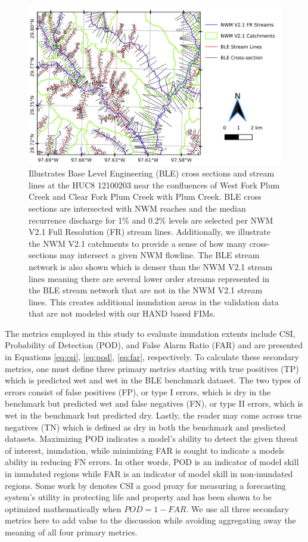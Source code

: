 \documentclass[draft]{dependencies/agujournal2019}
\begin{document}
%
\begin{figure}[H]
\centering
\includegraphics[scale=1.0]{figures/ble_evaluation_method.jpg}
\caption{
Illustrates Base Level Engineering (BLE) cross sections and stream lines at the HUC8 12100203 near the confluences of West Fork Plum Creek and Clear Fork Plum Creek with Plum Creek.
BLE cross sections are intersected with NWM reaches and the median recurrence discharge for 1\% and 0.2\% levels are selected per NWM V2.1 Full Resolution (FR) stream lines.
Additionally, we illustrate the NWM V2.1 catchments to provide a sense of how many cross-sections may intersect a given NWM flowline.
The BLE stream network is also shown which is denser than the NWM V2.1 stream lines meaning there are several lower order streams represented in the BLE stream network that are not in the NWM V2.1 stream lines.
This creates additional inundation areas in the validation data that are not modeled with our HAND based FIMs.
}
\label{fig:ble_evaluation_method}
\end{figure}
%

The metrics employed in this study to evaluate inundation extents include CSI, Probability of Detection (POD), and False Alarm Ratio (FAR) and are presented in Equations \ref{eq:csi}, \ref{eq:pod}, \ref{eq:far}, respectively.
To calculate these secondary metrics, one must define three primary metrics starting with true positives (TP) which is predicted wet and wet in the BLE benchmark dataset.
The two types of errors consist of false positives (FP), or type I errors, which is dry in the benchmark but predicted wet and false negatives (FN), or type II errors, which is wet in the benchmark but predicted dry. 
Lastly, the reader may come across true negatives (TN) which is defined as dry in both the benchmark and predicted datasets.
Maximizing POD indicates a model's ability to detect the given threat of interest, inundation, while minimizing FAR is sought to indicate a models ability in reducing FN errors.
In other words, POD is an indicator of model skill in inundated regions while FAR is an indicator of model skill in non-inundated regions.
Some work by  denotes CSI a good proxy for measuring a forecasting system's utility in protecting life and property and has been shown to be optimized mathematically when $POD = 1 - FAR$.
We use all three secondary metrics here to add value to the discussion while avoiding aggregating away the meaning of all four primary metrics.
\end{document}
